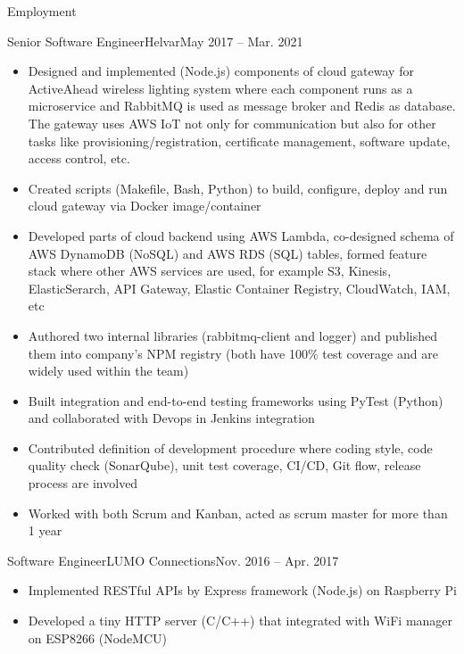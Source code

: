 \documentclass[print]{mcdowellcv}
\begin{document}
\begin{cvsection}{Employment}
		\begin{cvsubsection}{Senior Software Engineer}{Helvar}{May 2017 -- Mar. 2021}
			\begin{itemize}
			    \item Designed and implemented (Node.js) components of cloud gateway for ActiveAhead wireless lighting system where each component runs as a microservice and RabbitMQ is used as message broker and Redis as database. The gateway uses AWS IoT not only for communication but also for other tasks like provisioning/registration, certificate management, software update, access control, etc.
				\item Created scripts (Makefile, Bash, Python) to build, configure, deploy and run cloud gateway via Docker image/container
				\item Developed parts of cloud backend using AWS Lambda, co-designed schema of AWS DynamoDB (NoSQL) and AWS RDS (SQL) tables, formed feature stack where other AWS services are used, for example S3, Kinesis, ElasticSerarch, API Gateway, Elastic Container Registry, CloudWatch, IAM, etc
				\item Authored two internal libraries (rabbitmq-client and logger) and published them into company's NPM registry (both have 100\% test coverage and are widely used within the team)
				\item Built integration and end-to-end testing frameworks using PyTest (Python) and collaborated with Devops in Jenkins integration
				\item Contributed definition of development procedure where coding style, code quality check (SonarQube), unit test coverage, CI/CD, Git flow, release process are involved
				\item Worked with both Scrum and Kanban, acted as scrum master for more than 1 year
			\end{itemize}
		\end{cvsubsection}
		
		\begin{cvsubsection}{Software Engineer}{LUMO Connections}{Nov. 2016 -- Apr. 2017}
			\begin{itemize}
				\item Implemented RESTful APIs by Express framework (Node.js) on Raspberry Pi
				\item Developed a tiny HTTP server (C/C++) that integrated with WiFi manager on ESP8266 (NodeMCU)
			\end{itemize}
		\end{cvsubsection}
			

\end{cvsection}
\end{document}
